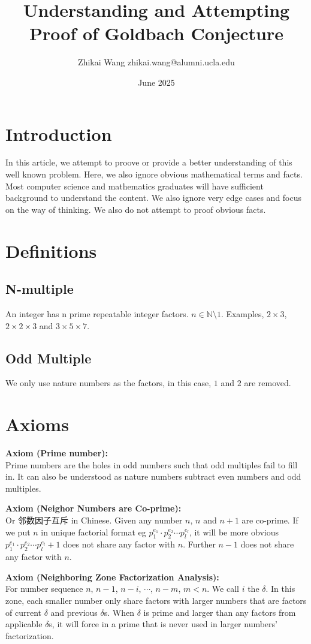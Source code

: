 \documentclass{article}
\title{Understanding and Attempting Proof of Goldbach Conjecture}
\author{Zhikai Wang zhikai.wang@alumni.ucla.edu}
\date{June 2025}
\begin{document}
\maketitle

\section{Introduction}
In this article, we attempt to proove or provide a better understanding of this well known problem. Here, we also ignore obvious mathematical terms and facts. Most computer science and mathematics graduates will have sufficient background to understand the content. We also ignore very edge cases and focus on the way of thinking. We also do not attempt to proof obvious facts.
\section{Definitions}
\subsection*{N-multiple}
An integer has n prime repeatable integer factors. $n \in \mathbb{N} \setminus {1}$. Examples, $2\times 3$,$2\times 2\times 3$ and $3\times 5\times7$.
\subsection*{Odd Multiple}
We only use nature numbers as the factors, in this case, $1$ and $2$ are removed.
\section{Axioms}

\noindent \textbf{Axiom (Prime number):} \\
Prime numbers are the holes in odd numbers such that odd multiples fail to fill in. It can also be understood as nature numbers subtract even numbers and odd multiples.
\bigskip

\noindent \textbf{Axiom (Neighor Numbers are Co-prime):} \\
Or 邻数因子互斥 in Chinese. Given any number $n$, $n$ and $n+1$ are co-prime. If we put $n$ in unique factorial format eg
$p_1^{e_1} \cdot p_2^{e_2} \cdots p_l^{e_l}$, it will be more obvious $p_1^{e_1} \cdot p_2^{e_2} \cdots p_l^{e_l} + 1$ does not share any factor with $n$. Further $n-1$ does not share any factor with $n$.
\bigskip

\noindent \textbf{Axiom (Neighboring Zone Factorization Analysis):} \\
For number sequence $n$, $n-1$, $n-i$, $\cdots $, $n-m$, $m < n$. We call $i$ the $\delta $. In this zone, each smaller number only share factors with larger numbers that are factors of current $\delta $ and previous $\delta $s. When $\delta $ is prime and larger than any factors from applicable $\delta $s, it will force in a prime that is never used in larger numbers' factorization.
\bigskip
\end{document}
